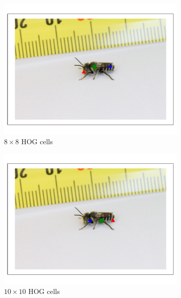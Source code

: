 \documentclass[11pt, oneside]{report}
\begin{document}
\begin{figure}[p]
\begin{subfigure}[b]{0.3\textwidth}
                \includegraphics[width=\textwidth]{hog8_3.pdf}
                \caption{$8\times8$ HOG cells}
            \end{subfigure}
            \begin{subfigure}[b]{0.3\textwidth}
                \centering
                \includegraphics[width=\textwidth]{hog10_3.pdf}
                \caption{$10\times10$ HOG cells}
            \end{subfigure}
            \begin{subfigure}[b]{0.3\textwidth}
                \centering

\end{subfigure}
\end{figure}
\end{document}
